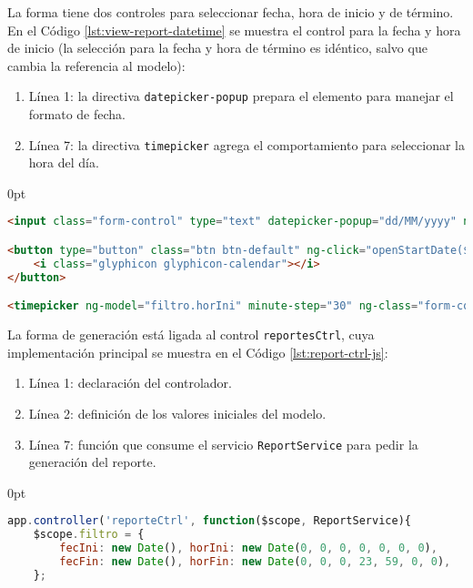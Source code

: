 \begin{enumerate}
La forma tiene dos controles para seleccionar fecha, hora de inicio y de término. En el Código \ref{lst:view-report-datetime} se muestra el control para la fecha y hora de inicio (la selección para la fecha y hora de término es idéntico, salvo que cambia la referencia al modelo):
\begin{enumerate}
	\item Línea 1: la directiva \texttt{datepicker-popup} prepara el elemento para manejar el formato de fecha.
	\item Línea 7: la directiva \texttt{timepicker} agrega el comportamiento para seleccionar la hora del día.
\end{enumerate}
\begin{adjustwidth}{\listingfixwidth}{0pt}
\begin{lstlisting}[language=HTML, captionpos=b, caption={Controles para seleccionar fecha y hora en la generación de reportes.}, label={lst:view-report-datetime}]
<input class="form-control" type="text" datepicker-popup="dd/MM/yyyy" ng-model="filtro.fecIni" is-open="startDateOpen" ng-required="true" starting-day="1" />

<button type="button" class="btn btn-default" ng-click="openStartDate($event)">
	<i class="glyphicon glyphicon-calendar"></i>
</button>

<timepicker ng-model="filtro.horIni" minute-step="30" ng-class="form-control"></timepicker>
\end{lstlisting}
\end{adjustwidth}

La forma de generación está ligada al control \texttt{reportesCtrl}, cuya implementación principal se muestra en el Código \ref{lst:report-ctrl-js}:

\begin{enumerate}
	\item Línea 1: declaración del controlador.
	\item Línea 2: definición de los valores iniciales del modelo.
	\item Línea 7: función que consume el servicio \texttt{ReportService} para pedir la generación del reporte.
\end{enumerate}

\begin{adjustwidth}{\listingfixwidth}{0pt}
\begin{lstlisting}[language=Javascript, caption={Servicio en \textit{AngularJS} para pedir la generación de un reporte.}, captionpos=b, label={lst:report-ctrl-js}]
app.controller('reporteCtrl', function($scope, ReportService){
	$scope.filtro = {
		fecIni: new Date(), horIni: new Date(0, 0, 0, 0, 0, 0, 0),
		fecFin: new Date(), horFin: new Date(0, 0, 0, 23, 59, 0, 0),
	};
	

\end{lstlisting}
\end{adjustwidth}
\end{enumerate}
